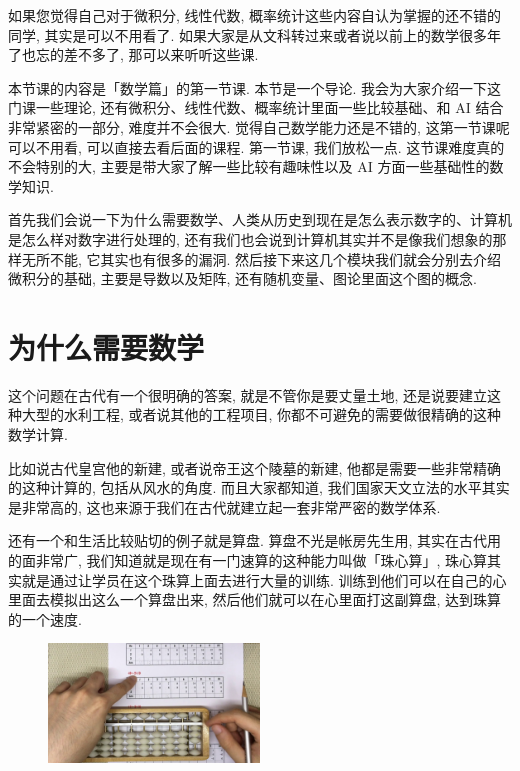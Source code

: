 如果您觉得自己对于微积分, 线性代数, 概率统计这些内容自认为掌握的还不错的同学, 其实是可以不用看了. 如果大家是从文科转过来或者说以前上的数学很多年了也忘的差不多了, 那可以来听听这些课. 

本节课的内容是「数学篇」的第一节课. 本节是一个导论. 我会为大家介绍一下这门课一些理论, 还有微积分、线性代数、概率统计里面一些比较基础、和 AI 结合非常紧密的一部分, 难度并不会很大. 觉得自己数学能力还是不错的, 这第一节课呢可以不用看, 可以直接去看后面的课程. 第一节课, 我们放松一点. 这节课难度真的不会特别的大, 主要是带大家了解一些比较有趣味性以及 AI 方面一些基础性的数学知识. 

首先我们会说一下为什么需要数学、人类从历史到现在是怎么表示数字的、计算机是怎么样对数字进行处理的, 还有我们也会说到计算机其实并不是像我们想象的那样无所不能, 它其实也有很多的漏洞. 然后接下来这几个模块我们就会分别去介绍微积分的基础, 主要是导数以及矩阵, 还有随机变量、图论里面这个图的概念. 

\section{为什么需要数学}

这个问题在古代有一个很明确的答案, 就是不管你是要丈量土地, 还是说要建立这种大型的水利工程, 或者说其他的工程项目, 你都不可避免的需要做很精确的这种数学计算. 

比如说古代皇宫他的新建, 或者说帝王这个陵墓的新建, 他都是需要一些非常精确的这种计算的, 包括从风水的角度. 而且大家都知道, 我们国家天文立法的水平其实是非常高的, 这也来源于我们在古代就建立起一套非常严密的数学体系. 

还有一个和生活比较贴切的例子就是算盘. 算盘不光是帐房先生用, 其实在古代用的面非常广, 我们知道就是现在有一门速算的这种能力叫做「珠心算」, 珠心算其实就是通过让学员在这个珠算上面去进行大量的训练. 训练到他们可以在自己的心里面去模拟出这么一个算盘出来, 然后他们就可以在心里面打这副算盘, 达到珠算的一个速度. 

\begin{figure}[ht]
  \centering
  \includegraphics[width=0.5\textwidth]{asset/1c84c0f7-5335-4252-88ac-5e08192d89c3.png}
  \caption{}
  \label{fig:img2_1}
\end{figure}

